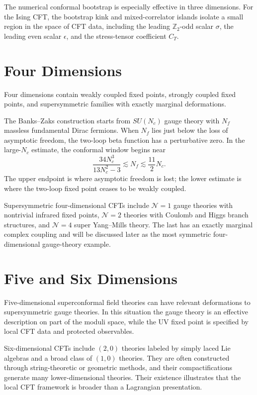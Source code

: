The numerical conformal bootstrap is especially effective in three
dimensions.  For the Ising CFT, the bootstrap kink and mixed-correlator
islands isolate a small region in the space of CFT data, including the leading
\(\mathbb Z_2\)-odd scalar \(\sigma\), the leading even scalar
\(\epsilon\), and the stress-tensor coefficient \(C_T\).

\section{Four Dimensions}

Four dimensions contain weakly coupled fixed points, strongly coupled fixed
points, and supersymmetric families with exactly marginal deformations.

The Banks--Zaks construction starts from \(SU(N_c)\) gauge theory with
\(N_f\) massless fundamental Dirac fermions.  When \(N_f\) lies just below the
loss of asymptotic freedom, the two-loop beta function has a perturbative
zero.  In the large-\(N_c\) estimate, the conformal window begins near
\begin{equation}
  \frac{34N_c^3}{13N_c^2-3}
  \lesssim
  N_f
  \lesssim
  \frac{11}{2}N_c .
  \label{eq:banks-zaks-window-estimate}
\end{equation}
The upper endpoint is where asymptotic freedom is lost; the lower estimate is
where the two-loop fixed point ceases to be weakly coupled.

Supersymmetric four-dimensional CFTs include \(\mathcal N=1\) gauge theories
with nontrivial infrared fixed points, \(\mathcal N=2\) theories with Coulomb
and Higgs branch structures, and \(\mathcal N=4\) super Yang--Mills theory.
The last has an exactly marginal complex coupling and will be discussed later
as the most symmetric four-dimensional gauge-theory example.

\section{Five and Six Dimensions}

Five-dimensional superconformal field theories can have relevant
deformations to supersymmetric gauge theories.  In this situation the gauge
theory is an effective description on part of the moduli space, while the UV
fixed point is specified by local CFT data and protected observables.

Six-dimensional CFTs include \((2,0)\) theories labeled by simply laced Lie
algebras and a broad class of \((1,0)\) theories.  They are often constructed
through string-theoretic or geometric methods, and their compactifications
generate many lower-dimensional theories.  Their existence illustrates that
the local CFT framework is broader than a Lagrangian presentation.

